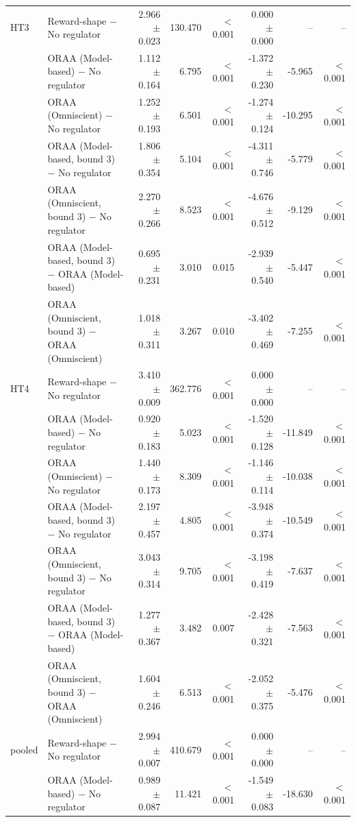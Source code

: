 \begin{tabular}{llrrrrrr}
\addlinespace
HT3 & Reward-shape $-$ No regulator & 2.966 $\pm$ 0.023 & 130.470 & $<$0.001 & 0.000 $\pm$ 0.000 & -- & -- \\
 & ORAA (Model-based) $-$ No regulator & 1.112 $\pm$ 0.164 & 6.795 & $<$0.001 & -1.372 $\pm$ 0.230 & -5.965 & $<$0.001 \\
 & ORAA (Omniscient) $-$ No regulator & 1.252 $\pm$ 0.193 & 6.501 & $<$0.001 & -1.274 $\pm$ 0.124 & -10.295 & $<$0.001 \\
 & ORAA (Model-based, bound 3) $-$ No regulator & 1.806 $\pm$ 0.354 & 5.104 & $<$0.001 & -4.311 $\pm$ 0.746 & -5.779 & $<$0.001 \\
 & ORAA (Omniscient, bound 3) $-$ No regulator & 2.270 $\pm$ 0.266 & 8.523 & $<$0.001 & -4.676 $\pm$ 0.512 & -9.129 & $<$0.001 \\
 & ORAA (Model-based, bound 3) $-$ ORAA (Model-based) & 0.695 $\pm$ 0.231 & 3.010 & 0.015 & -2.939 $\pm$ 0.540 & -5.447 & $<$0.001 \\
 & ORAA (Omniscient, bound 3) $-$ ORAA (Omniscient) & 1.018 $\pm$ 0.311 & 3.267 & 0.010 & -3.402 $\pm$ 0.469 & -7.255 & $<$0.001 \\
\addlinespace
HT4 & Reward-shape $-$ No regulator & 3.410 $\pm$ 0.009 & 362.776 & $<$0.001 & 0.000 $\pm$ 0.000 & -- & -- \\
 & ORAA (Model-based) $-$ No regulator & 0.920 $\pm$ 0.183 & 5.023 & $<$0.001 & -1.520 $\pm$ 0.128 & -11.849 & $<$0.001 \\
 & ORAA (Omniscient) $-$ No regulator & 1.440 $\pm$ 0.173 & 8.309 & $<$0.001 & -1.146 $\pm$ 0.114 & -10.038 & $<$0.001 \\
 & ORAA (Model-based, bound 3) $-$ No regulator & 2.197 $\pm$ 0.457 & 4.805 & $<$0.001 & -3.948 $\pm$ 0.374 & -10.549 & $<$0.001 \\
 & ORAA (Omniscient, bound 3) $-$ No regulator & 3.043 $\pm$ 0.314 & 9.705 & $<$0.001 & -3.198 $\pm$ 0.419 & -7.637 & $<$0.001 \\
 & ORAA (Model-based, bound 3) $-$ ORAA (Model-based) & 1.277 $\pm$ 0.367 & 3.482 & 0.007 & -2.428 $\pm$ 0.321 & -7.563 & $<$0.001 \\
 & ORAA (Omniscient, bound 3) $-$ ORAA (Omniscient) & 1.604 $\pm$ 0.246 & 6.513 & $<$0.001 & -2.052 $\pm$ 0.375 & -5.476 & $<$0.001 \\
\addlinespace
pooled & Reward-shape $-$ No regulator & 2.994 $\pm$ 0.007 & 410.679 & $<$0.001 & 0.000 $\pm$ 0.000 & -- & -- \\
 & ORAA (Model-based) $-$ No regulator & 0.989 $\pm$ 0.087 & 11.421 & $<$0.001 & -1.549 $\pm$ 0.083 & -18.630 & $<$0.001 \\

\end{tabular}
